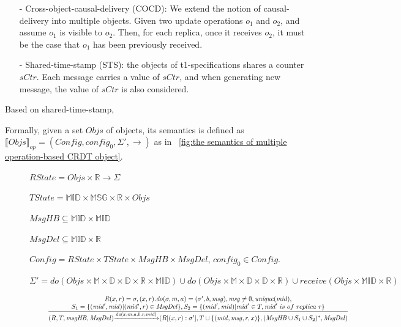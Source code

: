 {\begin{itemize}
\setlength{\itemsep}{0.5pt}
\item[-] Cross-object-causal-delivery (COCD): We extend the notion of causal-delivery into multiple objects. Given two update operations $o_1$ and $o_2$, and assume $o_1$ is visible to $o_2$. Then, for each replica, once it receives $o_2$, it must be the case that $o_1$ has been previously received.

\item[-] Shared-time-stamp (STS): the objects of t1-specifications shares a counter $\mathit{sCtr}$. Each message carries a value of $\mathit{sCtr}$, and when generating new message, the value of $\mathit{sCtr}$ is also considered.
\end{itemize}



Based on shared-time-stamp,



Formally, given a set $\mathit{Objs}$ of objects, its semantics is defined as $\llbracket \mathit{Objs} \rrbracket_{\mathit{op}} = (\mathit{Config},\mathit{config}_0,\Sigma',\rightarrow)$ as in \figurename~\ref{fig:the semantics of multiple operation-based CRDT object}.


\begin{figure}[ht]
$\mathit{RState} = \mathit{Objs} \times \mathbb{R} \rightarrow \Sigma$

$\mathit{TState} = \mathbb{MID} \times \mathbb{MSG} \times \mathbb{R} \times \mathit{Objs}$

$\mathit{MsgHB} \subseteq \mathbb{MID} \times \mathbb{MID}$

$\mathit{MsgDel} \subseteq \mathbb{MID} \times \mathbb{R}$

$\mathit{Config} = \mathit{RState} \times \mathit{TState} \times \mathit{MsgHB} \times \mathit{MsgDel}$, $\mathit{config}_0 \in \mathit{Config}$.

$\Sigma' = \mathit{do}(\mathit{Objs} \times \mathbb{M} \times \mathbb{D} \times \mathbb{D} \times \mathbb{R} \times \mathbb{MID}) \cup \mathit{do}(\mathit{Objs} \times \mathbb{M} \times \mathbb{D} \times \mathbb{D} \times \mathbb{R}) \cup \mathit{receive}(\mathit{Objs} \times \mathbb{MID} \times \mathbb{R})$

\begin{itemize}
\setlength{\itemsep}{0.5pt}
\item[] $\begin{array}{l c}
   \bigfrac{
   \begin{array}{c}
     R(x,r) = \sigma, (x,r).\mathit{do}(\sigma,m,a) = (\sigma',b,\mathit{msg}), \mathit{msg} \neq \emptyset, \mathit{unique}(\mathit{mid}), \\
     S_1 = \{ (\mathit{mid}',\mathit{mid}) \vert (\mathit{mid'},r) \in \mathit{MsgDel} \}, S_2 = \{ (\mathit{mid}',\mathit{mid}) \vert \mathit{mid}' \in T, \mathit{mid}' \ is \ of \ replica \ r \}
   \end{array}}
     {(R,T,\mathit{msgHB},\mathit{MsgDel}) {\xrightarrow{\mathit{do}(x,m,a,b,r,\mathit{mid})}} (R[(x,r):\sigma'], T \cup \{ (\mathit{mid},\mathit{msg},r,x) \}, (\mathit{MsgHB} \cup S_1 \cup S_2)^*,\mathit{MsgDel})}
\end{array}$


\end{itemize}
\end{figure}}
